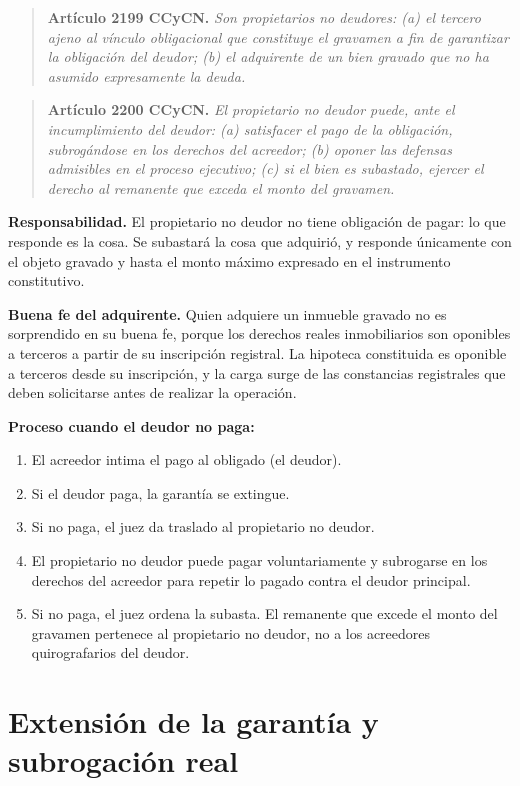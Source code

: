 \documentclass[12pt,oneside]{book}
\begin{document}
\begin{quote}
\textbf{Artículo 2199 CCyCN.} \textit{Son propietarios no deudores: (a) el tercero ajeno al vínculo obligacional que constituye el gravamen a fin de garantizar la obligación del deudor; (b) el adquirente de un bien gravado que no ha asumido expresamente la deuda.}
\end{quote}

\begin{quote}
\textbf{Artículo 2200 CCyCN.} \textit{El propietario no deudor puede, ante el incumplimiento del deudor: (a) satisfacer el pago de la obligación, subrogándose en los derechos del acreedor; (b) oponer las defensas admisibles en el proceso ejecutivo; (c) si el bien es subastado, ejercer el derecho al remanente que exceda el monto del gravamen.}
\end{quote}

\textbf{Responsabilidad.} El propietario no deudor no tiene obligación de pagar: lo que responde es la cosa. Se subastará la cosa que adquirió, y responde únicamente con el objeto gravado y hasta el monto máximo expresado en el instrumento constitutivo.

\textbf{Buena fe del adquirente.} Quien adquiere un inmueble gravado no es sorprendido en su buena fe, porque los derechos reales inmobiliarios son oponibles a terceros a partir de su inscripción registral. La hipoteca constituida es oponible a terceros desde su inscripción, y la carga surge de las constancias registrales que deben solicitarse antes de realizar la operación.

\textbf{Proceso cuando el deudor no paga:}
\begin{enumerate}
    \item El acreedor intima el pago al obligado (el deudor).
    \item Si el deudor paga, la garantía se extingue.
    \item Si no paga, el juez da traslado al propietario no deudor.
    \item El propietario no deudor puede pagar voluntariamente y subrogarse en los derechos del acreedor para repetir lo pagado contra el deudor principal.
    \item Si no paga, el juez ordena la subasta. El remanente que excede el monto del gravamen pertenece al propietario no deudor, no a los acreedores quirografarios del deudor.
\end{enumerate}

\section{Extensión de la garantía y subrogación real}
\end{document}
